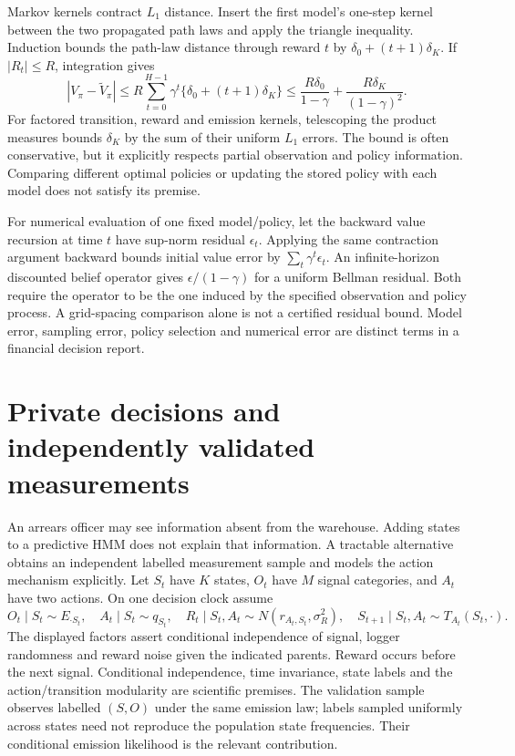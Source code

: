 Markov kernels contract $L_1$ distance. Insert the first model's one-step
kernel between the two propagated path laws and apply the triangle
inequality. Induction bounds the path-law distance through reward $t$ by
$\delta_0+(t+1)\delta_K$. If $|R_t|\le R$, integration gives
\begin{equation}
 |V_\pi-\widetilde V_\pi|
 \le R\sum_{t=0}^{H-1}\gamma^t
               \{\delta_0+(t+1)\delta_K\}
 \le \frac{R\delta_0}{1-\gamma}
       +\frac{R\delta_K}{(1-\gamma)^2}.
 \label{s4:pomdp-path-bound}
\end{equation}
For factored transition, reward and emission kernels, telescoping the
product measures bounds $\delta_K$ by the sum of their uniform $L_1$
errors. The bound is often conservative, but it explicitly respects partial
observation and policy information. Comparing different optimal policies
or updating the stored policy with each model does not satisfy its premise.

For numerical evaluation of one fixed model/policy, let the backward value
recursion at time $t$ have sup-norm residual $\epsilon_t$. Applying the
same contraction argument backward bounds initial value error by
$\sum_t\gamma^t\epsilon_t$. An infinite-horizon discounted belief
operator gives $\epsilon/(1-\gamma)$ for a uniform Bellman residual.
Both require the operator to be the one induced by the specified observation
and policy process. A grid-spacing comparison alone is not a certified
residual bound. Model error, sampling error, policy selection and numerical
error are distinct terms in a financial decision report.


\section{Private decisions and independently validated measurements}
\label{s5:private-logger}
An arrears officer may see information absent from the warehouse. Adding
states to a predictive HMM does not explain that information. A tractable
alternative obtains an independent labelled measurement sample and models
the action mechanism explicitly. Let $S_t$ have $K$ states, $O_t$ have $M$
signal categories, and $A_t$ have two actions. On one decision clock assume
\[
 O_t\mid S_t\sim E_{\cdot S_t},\quad
 A_t\mid S_t\sim q_{S_t},\quad
 R_t\mid S_t,A_t\sim N(r_{A_t,S_t},\sigma_R^2),\quad
 S_{t+1}\mid S_t,A_t\sim T_{A_t}(S_t,\cdot).
\]
The displayed factors assert conditional independence of signal, logger
randomness and reward noise given the indicated parents. Reward occurs before
the next signal. Conditional independence, time invariance, state labels and
the action/transition modularity are scientific premises. The validation
sample observes labelled $(S,O)$ under the same emission law; labels sampled
uniformly across states need not reproduce the population state frequencies.
Their conditional emission likelihood is the relevant contribution.

